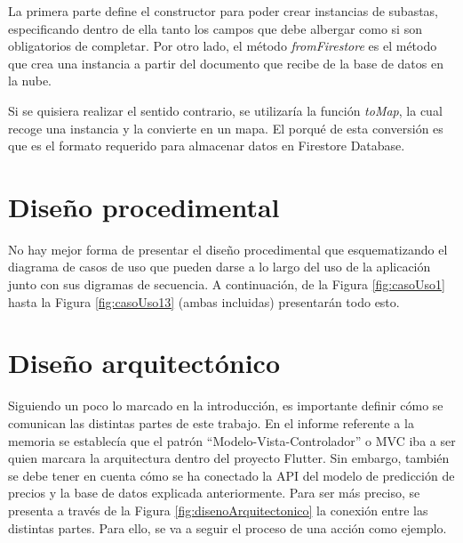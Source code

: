 
	La primera parte define el constructor para poder crear instancias de subastas, especificando dentro de ella tanto los campos que debe albergar como si son obligatorios de completar. Por otro lado, el método \emph{fromFirestore} es el método que crea una instancia a partir del documento que recibe de la base de datos en la nube.
	
	Si se quisiera realizar el sentido contrario, se utilizaría la función \emph{toMap}, la cual recoge una instancia y la convierte en un mapa. El porqué de esta conversión es que es el formato requerido para almacenar datos en Firestore Database.
	

\section{Diseño procedimental}

	No hay mejor forma de presentar el diseño procedimental que esquematizando el diagrama de casos de uso que pueden darse a lo largo del uso de la aplicación junto con sus digramas de secuencia. A continuación, de la Figura \ref{fig:casoUso1} hasta la Figura \ref{fig:casoUso13} (ambas incluidas) presentarán todo esto.
	


\section{Diseño arquitectónico}

	Siguiendo un poco lo marcado en la introducción, es importante definir cómo se comunican las distintas partes de este trabajo. En el informe referente a la memoria se establecía que el patrón ``Modelo-Vista-Controlador'' o MVC iba a ser quien marcara la arquitectura dentro del proyecto Flutter. Sin embargo, también se debe tener en cuenta cómo se ha conectado la API del modelo de predicción de precios y la base de datos explicada anteriormente.
	Para ser más preciso, se presenta a través de la Figura \ref{fig:disenoArquitectonico} la conexión entre las distintas partes. Para ello, se va a seguir el proceso de una acción como ejemplo.

